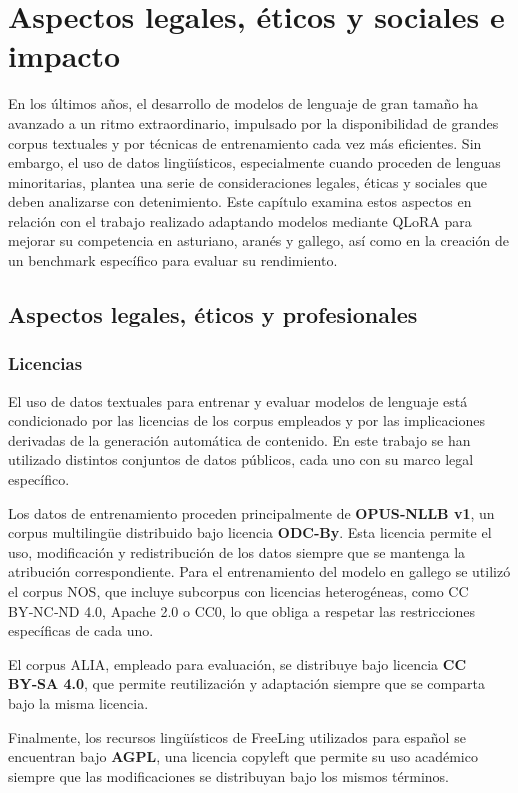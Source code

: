 \chapter{Aspectos legales, éticos y sociales e impacto}
\label{ch:analisis}

En los últimos años, el desarrollo de modelos de lenguaje de gran tamaño ha avanzado a un ritmo extraordinario, impulsado por la disponibilidad de grandes corpus textuales y por técnicas de entrenamiento cada vez más eficientes. Sin embargo, el uso de datos lingüísticos, especialmente cuando proceden de lenguas minoritarias, plantea una serie de consideraciones legales, éticas y sociales que deben analizarse con detenimiento. Este capítulo examina estos aspectos en relación con el trabajo realizado adaptando modelos mediante QLoRA para mejorar su competencia en asturiano, aranés y gallego, así como en la creación de un benchmark específico para evaluar su rendimiento.

\section{Aspectos legales, éticos y profesionales}

\subsection{Licencias}

El uso de datos textuales para entrenar y evaluar modelos de lenguaje está condicionado por las licencias de los corpus empleados y por las implicaciones derivadas de la generación automática de contenido. En este trabajo se han utilizado distintos conjuntos de datos públicos, cada uno con su marco legal específico.

Los datos de entrenamiento proceden principalmente de \textbf{OPUS‑NLLB v1}, un corpus multilingüe distribuido bajo licencia \textbf{ODC‑By}. Esta licencia permite el uso, modificación y redistribución de los datos siempre que se mantenga la atribución correspondiente. Para el entrenamiento del modelo en gallego se utilizó el corpus NOS, que incluye subcorpus con licencias heterogéneas, como CC BY‑NC‑ND 4.0, Apache 2.0 o CC0, lo que obliga a respetar las restricciones específicas de cada uno.

El corpus ALIA, empleado para evaluación, se distribuye bajo licencia \textbf{CC BY‑SA 4.0}, que permite reutilización y adaptación siempre que se comparta bajo la misma licencia.

Finalmente, los recursos lingüísticos de FreeLing utilizados para español se encuentran bajo \textbf{AGPL}, una licencia copyleft que permite su uso académico siempre que las modificaciones se distribuyan bajo los mismos términos.

